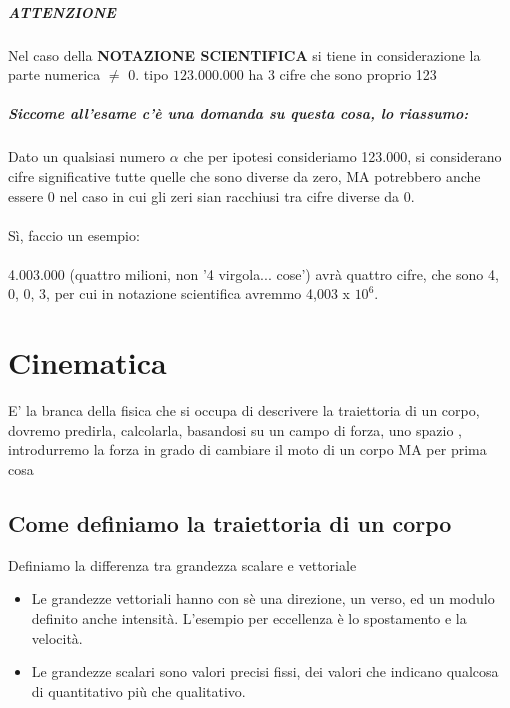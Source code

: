 \documentclass[12pt, a4paper, openany, oneside]{book}
\begin{document}
\paragraph{ATTENZIONE} Nel caso della \textbf{NOTAZIONE SCIENTIFICA} si tiene
in considerazione la parte numerica $\neq$ 0. tipo $123.000.000$ ha 3 cifre che 
sono proprio 123
\paragraph{Siccome all'esame c'è una domanda su questa cosa, lo riassumo: } Dato
un qualsiasi numero $\alpha$ che per ipotesi consideriamo 123.000, si considerano
cifre significative tutte quelle che sono diverse da zero, MA potrebbero anche
essere 0 nel caso in cui gli zeri sian racchiusi tra cifre diverse da 0. \\ \\
Sì, faccio un esempio: \\ \\
4.003.000 (quattro milioni, non '4 virgola... cose') avrà quattro cifre, che sono 
4, 0, 0, 3, per cui in notazione scientifica avremmo 4,003 x $10^{6}$.
\chapter{Cinematica}
E' la branca della fisica che si occupa di descrivere la traiettoria di un 
corpo, dovremo predirla, calcolarla, basandosi su un campo di forza, uno spazio
, introdurremo la forza in grado di cambiare il moto di un corpo MA per prima 
cosa
\section{Come definiamo la traiettoria di un corpo}
Definiamo la differenza tra grandezza scalare e vettoriale
\begin{itemize}
	\item Le grandezze vettoriali hanno con sè una direzione, un verso, ed un
	modulo definito anche intensità. L'esempio per eccellenza è lo spostamento 
	e la velocità.
	\item Le grandezze scalari sono valori precisi fissi, dei valori che indicano 
	qualcosa di quantitativo più che qualitativo.
\end{itemize}
\end{document}
